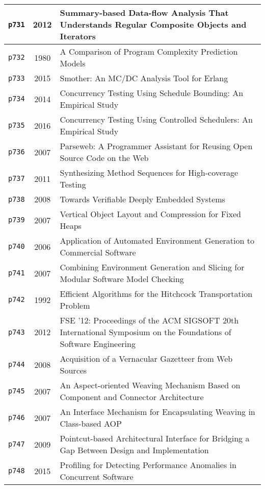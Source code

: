 \begin{longtable}{| c | c | p{16cm} |}
  \hline
  \texttt{p731} & 2012 & Summary-based Data-flow Analysis That Understands Regular Composite Objects and Iterators \\
  \hline
  \texttt{p732} & 1980 & A Comparison of Program Complexity Prediction Models \\
  \hline
  \texttt{p733} & 2015 & Smother: An MC/DC Analysis Tool for Erlang \\
  \hline
  \texttt{p734} & 2014 & Concurrency Testing Using Schedule Bounding: An Empirical Study \\
  \hline
  \texttt{p735} & 2016 & Concurrency Testing Using Controlled Schedulers: An Empirical Study \\
  \hline
  \texttt{p736} & 2007 & Parseweb: A Programmer Assistant for Reusing Open Source Code on the Web \\
  \hline
  \texttt{p737} & 2011 & Synthesizing Method Sequences for High-coverage Testing \\
  \hline
  \texttt{p738} & 2008 & Towards Verifiable Deeply Embedded Systems \\
  \hline
  \texttt{p739} & 2007 & Vertical Object Layout and Compression for Fixed Heaps \\
  \hline
  \texttt{p740} & 2006 & Application of Automated Environment Generation to Commercial Software \\
  \hline
  \texttt{p741} & 2007 & Combining Environment Generation and Slicing for Modular Software Model Checking \\
  \hline
  \texttt{p742} & 1992 & Efficient Algorithms for the Hitchcock Transportation Problem \\
  \hline
  \texttt{p743} & 2012 & FSE '12: Proceedings of the ACM SIGSOFT 20th International Symposium on the Foundations of Software Engineering \\
  \hline
  \texttt{p744} & 2008 & Acquisition of a Vernacular Gazetteer from Web Sources \\
  \hline
  \texttt{p745} & 2007 & An Aspect-oriented Weaving Mechanism Based on Component and Connector Architecture \\
  \hline
  \texttt{p746} & 2007 & An Interface Mechanism for Encapsulating Weaving in Class-based AOP \\
  \hline
  \texttt{p747} & 2009 & Pointcut-based Architectural Interface for Bridging a Gap Between Design and Implementation \\
  \hline
  \texttt{p748} & 2015 & Profiling for Detecting Performance Anomalies in Concurrent Software \\

\end{longtable}
